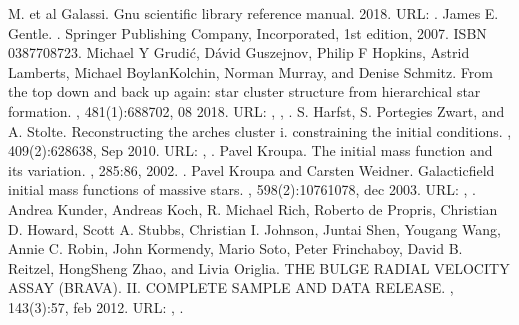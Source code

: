 \documentclass[letterpaper,10pt,english]{sphinxmanual}
\begin{document}
\begin{sphinxthebibliography}{10}
\sphinxAtStartPar
M. et al Galassi. Gnu scientific library reference manual. 2018. URL: .
\sphinxAtStartPar
James E. Gentle. . Springer Publishing Company, Incorporated, 1st edition, 2007. ISBN 0387708723.
\sphinxAtStartPar
Michael Y Grudić, Dávid Guszejnov, Philip F Hopkins, Astrid Lamberts, Michael Boylan\sphinxhyphen{}Kolchin, Norman Murray, and Denise Schmitz. From the top down and back up again: star cluster structure from hierarchical star formation. , 481(1):688\textendash{}702, 08 2018. URL: , , .
\sphinxAtStartPar
S. Harfst, S. Portegies Zwart, and A. Stolte. Reconstructing the arches cluster \sphinxhyphen{} i. constraining the initial conditions. , 409(2):628\textendash{}638, Sep 2010. URL: , .
\sphinxAtStartPar
Pavel Kroupa. The initial mass function and its variation. , 285:86, 2002. .
\sphinxAtStartPar
Pavel Kroupa and Carsten Weidner. Galactic\sphinxhyphen{}field initial mass functions of massive stars. , 598(2):1076\textendash{}1078, dec 2003. URL: , .
\sphinxAtStartPar
Andrea Kunder, Andreas Koch, R. Michael Rich, Roberto de Propris, Christian D. Howard, Scott A. Stubbs, Christian I. Johnson, Juntai Shen, Yougang Wang, Annie C. Robin, John Kormendy, Mario Soto, Peter Frinchaboy, David B. Reitzel, HongSheng Zhao, and Livia Origlia. THE BULGE RADIAL VELOCITY ASSAY (BRAVA). II. COMPLETE SAMPLE AND DATA RELEASE. , 143(3):57, feb 2012. URL: , .

\end{sphinxthebibliography}
\end{document}
